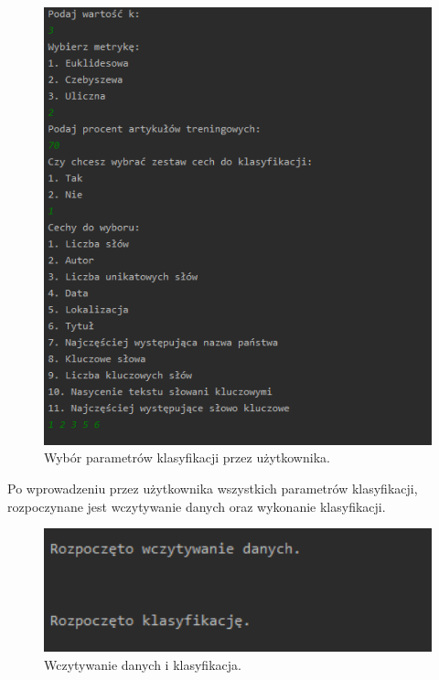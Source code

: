 \documentclass{classrep}
\begin{document}
\begin{figure}[h!]
 \centering
 \includegraphics[width=14cm]{Wybor.png}
 \vspace{-0.3cm}
 \caption{Wybór parametrów klasyfikacji przez użytkownika. }
 \label{Wybór parametrów klasyfikacji przez użytkownika. }
\end{figure}

Po wprowadzeniu przez użytkownika wszystkich parametrów klasyfikacji, rozpoczynane jest wczytywanie danych oraz wykonanie klasyfikacji. 
\begin{figure}[h!]
 \centering
 \includegraphics[width=14cm]{srodek.png}
 \vspace{-0.3cm}
 \caption{Wczytywanie danych i klasyfikacja.}
 \label{Wczytywanie danych i klasyfikacja.}
\end{figure}
\end{document}
